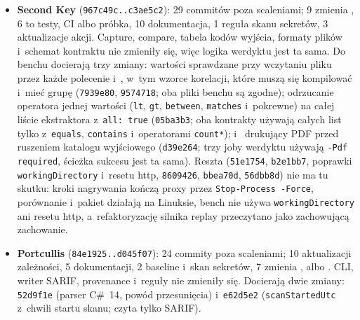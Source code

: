 \begin{itemize}
  \item \textbf{Second Key} (\texttt{967c49c..c3ae5c2}): 29 commitów poza scaleniami;
    9 zmienia , 6 to testy, CI albo próbka, 10 dokumentacja, 1 reguła skanu
    sekretów, 3 aktualizacje akcji. Capture, compare, tabela kodów wyjścia, formaty plików
    i~schemat kontraktu nie zmieniły się, więc logika werdyktu jest ta sama. Do benchu
    docierają trzy zmiany: wartości  sprawdzane przy wczytaniu pliku
    przez każde polecenie i~, w~tym wzorce korelacji, które muszą się
    kompilować i~mieć grupę (\texttt{7939e80}, \texttt{9574718}; oba pliki benchu są
    zgodne); odrzucanie operatora jednej wartości (\texttt{lt}, \texttt{gt}, \texttt{between},
    \texttt{matches} i~pokrewne) na całej liście ekstraktora z~\texttt{all: true}
    (\texttt{05ba3b3}; oba kontrakty używają całych list tylko z~\texttt{equals},
    \texttt{contains} i~operatorami \texttt{count*}); i~
    drukujący PDF przed ruszeniem katalogu wyjściowego (\texttt{d39e264}; trzy joby werdyktu
    używają \texttt{-Pdf required}, ścieżka sukcesu jest ta sama). Reszta (\texttt{51e1754},
    \texttt{b2e1bb7}, poprawki \texttt{workingDirectory} i~resetu http, \texttt{8609426},
    \texttt{bbea70d}, \texttt{56dbb8d}) nie ma tu skutku: kroki nagrywania kończą proxy
    przez \texttt{Stop-Process -Force}, porównanie i~pakiet działają na Linuksie, bench nie
    używa \texttt{workingDirectory} ani resetu http, a~refaktoryzację silnika replay
    przeczytano jako zachowującą zachowanie.
  \item \textbf{Portcullis} (\texttt{84e1925..d045f07}): 24 commity poza scaleniami;
    10 aktualizacji zależności, 5 dokumentacji, 2 baseline i~skan sekretów, 7 zmienia
    ,  albo . CLI, writer SARIF, provenance
    i~reguły nie zmieniły się. Docierają dwie zmiany: \texttt{52d9f1e} (parser C\#~14, powód
    przesunięcia) i~\texttt{e62d5e2} (\texttt{scanStartedUtc} z~chwili startu skanu;
     czyta tylko SARIF).
\end{itemize}

